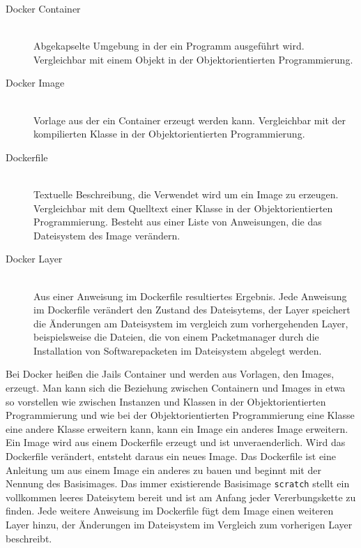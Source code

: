 \begin{description}
  \item[Docker Container] \mbox{}\\ Abgekapselte Umgebung in der ein Programm
    ausgeführt wird. Vergleichbar mit einem Objekt in der Objektorientierten
    Programmierung.
  \item[Docker Image] \mbox{}\\ Vorlage aus der ein Container erzeugt werden
    kann. Vergleichbar mit der kompilierten Klasse in der Objektorientierten
    Programmierung.
  \item[Dockerfile] \mbox{}\\ Textuelle Beschreibung, die Verwendet wird um ein
    Image zu erzeugen. Vergleichbar mit dem Quelltext einer Klasse in der
    Objektorientierten Programmierung. Besteht aus einer Liste von Anweisungen,
    die das Dateisystem des Image verändern.
  \item[Docker Layer] \mbox{}\\ Aus einer Anweisung im Dockerfile resultiertes
    Ergebnis. Jede Anweisung im Dockerfile verändert den Zustand des
    Dateisytems, der Layer speichert die Änderungen am Dateisystem im vergleich
    zum vorhergehenden Layer, beispielsweise die Dateien, die von einem
    Packetmanager durch die Installation von Softwarepacketen im Dateisystem
    abgelegt werden.
\end{description}

Bei Docker heißen die Jails Container und werden aus Vorlagen, den Images,
erzeugt. Man kann sich die Beziehung zwischen Containern und Images in etwa so
vorstellen wie zwischen Instanzen und Klassen in der Objektorientierten
Programmierung und wie bei der Objektorientierten Programmierung eine Klasse
eine andere Klasse erweitern kann, kann ein Image ein anderes Image erweitern.
Ein Image wird aus einem Dockerfile erzeugt und ist unveraenderlich. Wird das
Dockerfile verändert, entsteht daraus ein neues Image. Das Dockerfile ist eine
Anleitung um aus einem Image ein anderes zu bauen und beginnt mit der Nennung
des Basisimages. Das immer existierende Basisimage \texttt{scratch} stellt ein
vollkommen leeres Dateisytem bereit und ist am Anfang jeder Vererbungskette zu
finden. Jede weitere Anweisung im Dockerfile fügt dem Image einen weiteren Layer
hinzu, der Änderungen im Dateisystem im Vergleich zum vorherigen Layer
beschreibt.


